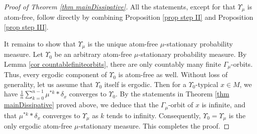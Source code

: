 \documentclass[11pt, leqno, fleqn]{amsart}
\def\clr{   \color{red}}
\theoremstyle{definition}
\theoremstyle{definition}
\begin{document}
    \begin{proof}[Proof of Theorem \ref{thm mainDissipative}]
    All the statements, except for that $\Upsilon_{\mu}$ is atom-free, follow directly by combining Proposition \ref{prop step II} and Proposition \ref{prop step III}. 
    
 
    It remains to show that $\Upsilon_{\mu}$ is the unique atom-free $\mu$-stationary probability measure. 
    Let $\Upsilon_{0}$ be an arbitrary atom-free  $\mu$-stationary probability measure. By Lemma \ref{cor countablefiniteorbits},  there are only countably many finite $\Gamma_{\mu}$-orbits. Thus, every ergodic component of $\Upsilon_{0}$ is atom-free as well. Without loss of generality, let us assume that $\Upsilon_{0}$ itself is ergodic.
    Then for a $\Upsilon_{0}$-typical $x \in M$, we have $\frac{1}{n}\sum_{k = 0}^{n-1} \mu^{*k} * \delta_{x}$ converges to $\Upsilon_0$. By the statements in Theorem \ref{thm mainDissipative} proved above, we deduce that the $\Gamma_{\mu}$-orbit of $x$ is infinite, and that $\mu^{*k} * \delta_{x}$ converges to $\Upsilon_{\mu}$ as $k$ tends to infinity. Consequently, $\Upsilon_0 = \Upsilon_{\mu}$ is the only ergodic atom-free $\mu$-stationary measure.
   This completes the proof.
	  \end{proof}
  
  
 
  
  
  
\end{document}
